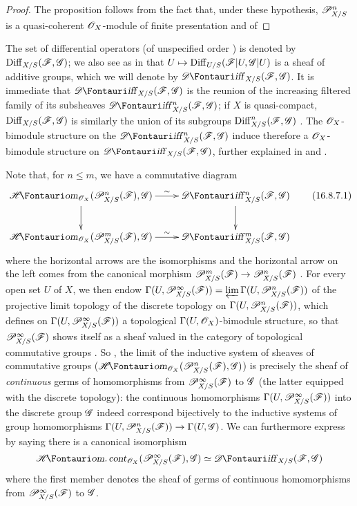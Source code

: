 \begin{proof}
  The proposition follows from the fact that, under these hypothesis, $\mathscr{P}_{X/S}^n$ is a quasi-coherent $\mathscr{O}_X$-module of finite presentation  and of 
\end{proof}

\begin{env}[16.8.6]
\label{IV.16.8.6}
The set of differential operators (of unspecified order ) is denoted by $\operatorname{Diff}_{X/S}(\mathscr{F}, \mathscr{G})$;
we also see as in  that $U \mapsto \Diff_{U/S}(\sh{F}|U, \sh{G}|U)$ is a sheaf of additive groups, which we will denote by $\shDiff_{X/S}(\sh{F}, \sh{G})$.
It is immediate that $\shDiff_{X/S}(\sh{F}, \sh{G})$ is the reunion of the increasing filtered family of its subsheaves $\shDiff_{X/S}^n(\sh{F}, \sh{G})$;
if $X$ is quasi-compact, $\operatorname{Diff}_{X/S}(\mathscr{F}, \mathscr{G})$ 
is similarly the union of its subgroups $\operatorname{Diff}_{X/S}^n(\mathscr{F}, \mathscr{G})$ .
The $\mathscr{O}_X$-bimodule structure on the $\shDiff_{X/S}^n(\sh{F}, \sh{G})$ induce therefore a $\mathscr{O}_X$-bimodule structure on $\shDiff_{X/S}(\sh{F}, \sh{G})$, further explained in  and .

Note that, for $n \leq m$, we have a commutative diagram
\[
  \label{IV.16.8.7.1}
  \xymatrix{
    \shHom_{\sh{O}_X}(\sh{P}_{X/S}^n(\sh{F}), \sh{G}) \ar[r]^-{\sim} \ar[d] & \shDiff_{X/S}^n(\sh{F}, \sh{G}) \ar[d] \\
    \shHom_{\sh{O}_X}(\sh{P}_{X/S}^m(\sh{F}), \sh{G}) \ar[r]^-{\sim} & \shDiff_{X/S}^m(\sh{F}, \sh{G})
  }
  \tag{16.8.7.1}
\] 
where the horizontal arrows are the isomorphisms  and the horizontal arrow on the left comes from the canonical morphism $\sh{P}_{X/S}^m(\sh{F}) \to \sh{P}_{X/S}^n(\sh{F})$ .
For every open set $U$ of $X$, we then endow $\Gamma(U, \mathscr{P}_{X/S}^\infty(\mathscr{F})) = \varprojlim \Gamma(U, \mathscr{P}_{X/S}^n(\mathscr{F}))$ of the projective limit topology of the discrete topology on $\Gamma(U, \mathscr{P}_{X/S}^n(\mathscr{F}))$, which defines on $\Gamma(U, \mathscr{P}_{X/S}^\infty(\mathscr{F}))$ a topological $\Gamma(U, \mathscr{O}_X)$-bimodule structure, so that $\mathscr{P}_{X/S}^\infty(\mathscr{F})$ shows itself as a sheaf valued in the category of topological commutative groups .
So \cite[II, 1.11]{I-4}, the limit of the inductive system of sheaves of commutative groups ($\shHom_{\sh{O}_X}(\sh{P}_{X/S}^n(\sh{F}), \sh{G})$) is precisely the sheaf of \emph{continuous} germs of homomorphisms from $\mathscr{P}_{X/S}^\infty(\mathscr{F})$ to $\mathscr{G}$ (the latter equipped with the discrete topology):
the continuous homomorphisms $\Gamma(U, \mathscr{P}_{X/S}^\infty(\mathscr{F}))$ into the discrete group $\mathscr{G}$ indeed correspond bijectively to the inductive systems of group homomorphisms $\Gamma(U, \sh{P}_{X/S}^n(\sh{F})) \to \Gamma(U, \sh{G})$.
We can furthermore express  by saying there is a canonical isomorphism
\[
  \shHomcont_{\sh{O}_X} (\sh{P}_{X/S}^\infty(\sh{F}), \sh{G}) \isoto \shDiff_{X/S}(\sh{F}, \sh{G})
\]
where the first member denotes the sheaf of germs of continuous homomorphisms from $\mathscr{P}_{X/S}^\infty(\mathscr{F})$ to $\mathscr{G}$.
\end{env}

